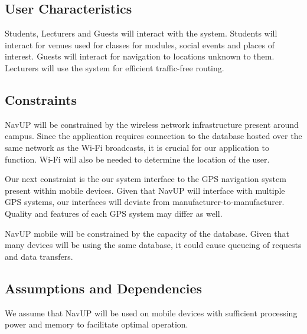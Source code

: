 \documentclass{article}
\begin{document}
    \subsection{User Characteristics}
        \begin{flushleft}
            Students, Lecturers and Guests will interact with the system.
            \break
            Students will interact for venues used for classes for modules, social events and places of interest.
            Guests will interact for navigation to locations unknown to them.
            Lecturers will use the system for efficient traffic-free routing.
        \end{flushleft}
    \subsection{Constraints}
        \begin{flushleft}
        NavUP will be constrained by the wireless network infrastructure present around campus. Since the application requires connection to the database hosted over the same network as the Wi-Fi broadcasts, it is crucial for our application to function. Wi-Fi will also be needed to determine the location of the user.
        \end{flushleft}
        
        \begin{flushleft}
        Our next constraint is the our system interface to the GPS navigation system present within mobile devices. Given that NavUP will interface with multiple GPS systems, our interfaces will deviate from manufacturer-to-manufacturer. Quality and features of each GPS system may differ as well.
        \end{flushleft}
        
        \begin{flushleft}
        NavUP mobile will be constrained by the capacity of the database. Given that many devices will be using the same database, it could cause queueing of requests and data transfers.
        \end{flushleft}
        \subsection{Assumptions and Dependencies}
        
        \begin{flushleft}
        We assume that NavUP will be used on mobile devices with sufficient processing power and memory to facilitate optimal operation.
        \end{flushleft}
        
\end{document}
